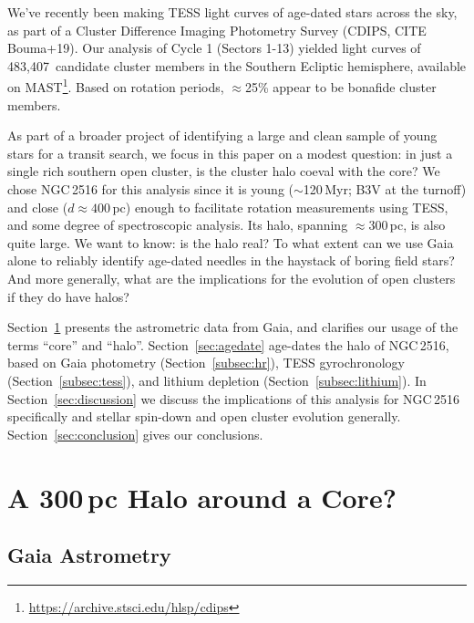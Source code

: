 \documentclass[12pt,twocolumn,tighten]{aastex63}
\newcommand{\numsouthernuniqlcs}{483{,}407\ } %
\begin{document}
We've recently been making TESS light curves of age-dated stars across
the sky, as part of a Cluster Difference Imaging Photometry Survey
(CDIPS, CITE Bouma+19).  Our analysis of Cycle 1 (Sectors 1-13) yielded
light curves of \numsouthernuniqlcs candidate cluster members in the
Southern Ecliptic hemisphere, available on
MAST\footnote{\url{https://archive.stsci.edu/hlsp/cdips}}.  Based on
rotation periods, $\approx$25\% appear to be bonafide cluster members. 

As part of a broader project of identifying a large and clean sample of
young stars for a transit search, we focus in this paper on a 
modest question: in just a single rich southern open cluster, is the
cluster halo coeval with the core?  We chose
NGC\,2516 for this analysis since it is young ($\sim$120\,Myr; B3V at
the turnoff) and close
($d\approx400$\,pc) enough to facilitate rotation measurements using
TESS, and some degree of spectroscopic analysis.  
Its halo, spanning $\approx$300\,pc, is also quite large.
We want to know: is
the halo real? To what extent can we use Gaia alone to reliably identify
age-dated needles in the haystack of boring field stars?  And more
generally, what are the implications for the evolution of open clusters
if they do have halos?

Section~\ref{sec:gaia} presents the astrometric data from Gaia, and
clarifies our usage of the terms ``core'' and ``halo''.
Section~\ref{sec:agedate} age-dates the halo of NGC\,2516, based on Gaia
photometry (Section~\ref{subsec:hr}), TESS gyrochronology
(Section~\ref{subsec:tess}), and lithium depletion
(Section~\ref{subsec:lithium}).  In Section~\ref{sec:discussion} we
discuss the implications of this analysis for NGC\,2516 specifically and
stellar spin-down and open cluster evolution generally.
Section~\ref{sec:conclusion} gives our conclusions.


\section{A 300\,pc Halo around a Core?}
\label{sec:gaia}
%
%

\subsection{Gaia Astrometry}
\label{subsec:astrometry}
\end{document}
